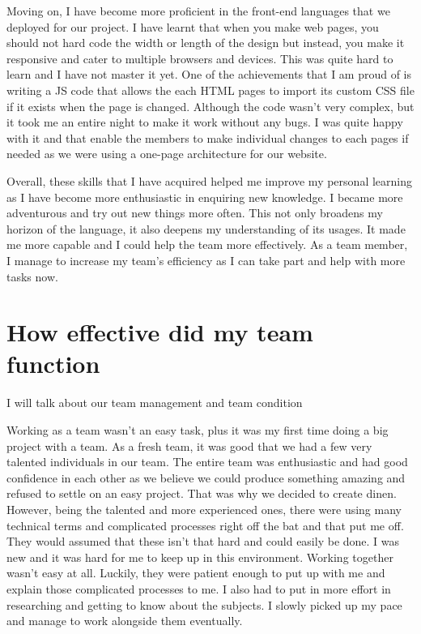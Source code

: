 \documentclass[a4paper]{article}
\begin{document}
Moving on, I have become more proficient in the front-end languages that we deployed for our project. I have learnt that when you make web pages, you should not hard code the width or length of the design but instead, you make it responsive and cater to multiple browsers and devices. This was quite hard to learn and I have not master it yet. One of the achievements that I am proud of is writing a JS code that allows the each HTML pages to import its custom CSS file if it exists when the page is changed. Although the code wasn’t very complex, but it took me an entire night to make it work without any bugs. I was quite happy with it and that enable the members to make individual changes to each pages if needed as we were using a one-page architecture for our website.
\newline

Overall, these skills that I have acquired helped me improve my personal learning as I have become more enthusiastic in enquiring new knowledge. I became more adventurous and try out new things more often. This not only broadens my horizon of the language, it also deepens my understanding of its usages. It made me more capable and I could help the team more effectively. As a team member, I manage to increase my team’s efficiency as I can take part and help with more tasks now.
\newpage

\section{How effective did my team function}\newline
I will talk about our team management and team condition
\newline

Working as a team wasn’t an easy task, plus it was my first time doing a big project with a team. As a fresh team, it was good that we had a few very talented individuals in our team.
The entire team was enthusiastic and had good confidence in each other as we believe we could produce something amazing and refused to settle on an easy project. That was why we decided to create dinen. However, being the talented and more experienced ones, there were using many technical terms and complicated processes right off the bat and that put me off. They would assumed that these isn’t that hard and could easily be done. I was new and it was hard for me to keep up in this environment. Working together wasn’t easy at all. Luckily, they were patient enough to put up with me and explain those complicated processes to me. I also had to put in more effort in researching and getting to know about the subjects. I slowly picked up my pace and manage to work alongside them eventually. 
\newline
\end{document}
